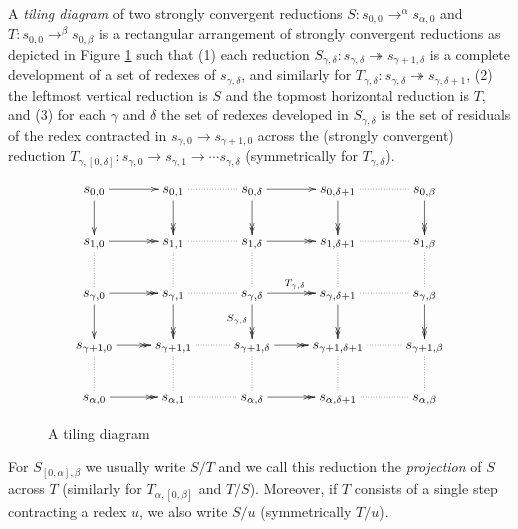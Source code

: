 \documentclass{LMCS}
\theoremstyle{plain}
\theoremstyle{definition}
\newcommand{\rew}{\rightarrow}
\newcommand{\trewt}{\twoheadrightarrow}
\begin{document}
\begin{defi}
A \emph{tiling diagram} of two strongly convergent reductions
$S : s_{0, 0} \rew^{\alpha} s_{\alpha, 0}$ and
$T: s_{0, 0} \rew^{\beta} s_{0, \beta}$ is a rectangular arrangement
of strongly convergent reductions as depicted in Figure \ref{fig:tile} such that (1) each reduction $S_{\gamma,\delta} : s_{\gamma,\delta} \trewt
s_{\gamma + 1,\delta}$ is a complete development of a set of redexes of $s_{\gamma,\delta}$, and similarly for $T_{\gamma,\delta} : s_{\gamma,\delta} \trewt s_{\gamma,\delta+1}$, (2) the leftmost vertical reduction is $S$ and the topmost horizontal reduction is $T$, and (3) for each $\gamma$ and $\delta$ the set of redexes developed in $S_{\gamma,\delta}$ is the set of residuals of the redex contracted in $s_{\gamma,0} \rew s_{\gamma + 1, 0}$ across the (strongly convergent) reduction $T_{\gamma, [0,\delta]} : s_{\gamma, 0} \rew s_{\gamma, 1} \rew \cdots s_{\gamma,\delta}$ (symmetrically for $T_{\gamma,\delta}$).

\begin{figure}
\[
\xymatrix{
s_{0, 0} \ar[r] \ar[d]
    & s_{0, 1} \ar@{.}[r] \ar@{->>}[d]
    & s_{0, \delta} \ar[r] \ar@{->>}[d]
    & s_{0, \delta + 1} \ar@{.}[r] \ar@{->>}[d]
    & s_{0, \beta} \ar@{->>}[d] \\
s_{1, 0} \ar@{->>}[r] \ar@{.}[d]
    & s_{1, 1} \ar@{.}[r] \ar@{.}[d]
    & s_{1, \delta} \ar@{->>}[r] \ar@{.}[d]
    & s_{1, \delta + 1} \ar@{.}[r] \ar@{.}[d]
    & s_{1, \beta} \ar@{.}[d] \\
s_{\gamma, 0} \ar@{->>}[r] \ar@{->}[d]
    & s_{\gamma, 1} \ar@{.}[r] \ar@{->>}[d]
    & s_{\gamma, \delta} \ar@{->>}[r] ^{T_{\gamma, \delta}}
                         \ar@{->>}[d]_{S_{\gamma, \delta}}
    & s_{\gamma, \delta + 1} \ar@{.}[r] \ar@{->>}[d]
    & s_{\gamma, \beta} \ar@{->>}[d] \\
s_{\gamma + 1, 0} \ar@{->>}[r] \ar@{.}[d]
    & s_{\gamma + 1, 1} \ar@{.}[r] \ar@{.}[d]
    & s_{\gamma + 1, \delta} \ar@{->>}[r] \ar@{.}[d]
    & s_{\gamma + 1,\delta + 1} \ar@{.}[r] \ar@{.}[d]
    & s_{\gamma + 1, \beta} \ar@{.}[d] \\
s_{\alpha, 0} \ar@{->>}[r]
    & s_{\alpha, 1} \ar@{.}[r]
    & s_{\alpha, \delta} \ar@{->>}[r]
    & s_{\alpha, \delta + 1} \ar@{.}[r]
    & s_{\alpha, \beta}
}
\]
\caption{\label{fig:tile}A tiling diagram}
\end{figure}
\end{defi}

For $S_{[0, \alpha], \beta}$ we usually write $S/T$ and we call this reduction the \emph{projection} of $S$ across $T$ (similarly for $T_{\alpha, [0, \beta]}$ and $T/S$). Moreover, if $T$ consists of a single step contracting a redex $u$, we also write $S/u$ (symmetrically $T/u$).
\end{document}
